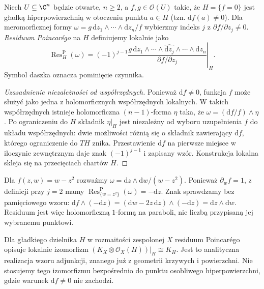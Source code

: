 \begin{definicja}
\label{def:ga4-poincare-res}
Niech $U\subseteq\C^n$ będzie otwarte, $n\ge2$, a
$f,g\in\mathcal O(U)$ takie, że $H=\{f=0\}$ jest
gładką hiperpowierzchnią w otoczeniu punktu $a\in H$
(tzn. $\mathrm df(a)\ne0$). Dla meromorficznej formy
$\omega=g\,\mathrm dz_1\wedge\cdots\wedge\mathrm dz_n/f$
wybierzmy indeks $j$ z $\partial f/\partial z_j\ne0$.
\emph{Residuum Poincarégo} na $H$ definiujemy lokalnie jako
\[
\operatorname{Res}_H^{\mathrm P}(\omega)
=\left.(-1)^{j-1}\frac{g\,\mathrm dz_1\wedge\cdots
\wedge\widehat{\mathrm dz_j}\wedge\cdots\wedge\mathrm dz_n}
{\partial f/\partial z_j}\right|_H.
\]
Symbol daszka oznacza pominięcie czynnika.
\end{definicja}
\begin{proof}[Uzasadnienie niezależności od współrzędnych]
Ponieważ $\mathrm df\ne0$, funkcja $f$ może służyć
jako jedna z holomorficznych współrzędnych lokalnych.
W takich współrzędnych istnieje holomorficzna $(n-1)$-forma
$\eta$ taka, że $\omega=(\mathrm df/f)\wedge\eta$.
Po ograniczeniu do $H$ składnik $\eta|_H$ jest
niezależny od wyboru uzupełnienia $f$ do układu
współrzędnych: dwie możliwości różnią się o składnik
zawierający $\mathrm df$, którego ograniczenie do $TH$
znika. Przestawienie $\mathrm df$ na pierwsze miejsce
w iloczynie zewnętrznym daje znak $(-1)^{j-1}$
i zapisany wzór. Konstrukcja lokalna skleja się na
przecięciach chartów $H$.
\end{proof}

\begin{przyklad}
Dla $f(z,w)=w-z^2$ rozważmy
$\omega=\mathrm dz\wedge\mathrm dw/(w-z^2)$.
Ponieważ $\partial_w f=1$, z definicji przy $j=2$ mamy
$\operatorname{Res}^{\mathrm P}_{\{w=z^2\}}(\omega)=-\mathrm dz$.
Znak sprawdzamy bez pamięciowego wzoru:
$\mathrm df\wedge(-\mathrm dz)
=(\mathrm dw-2z\,\mathrm dz)\wedge(-\mathrm dz)
=\mathrm dz\wedge\mathrm dw$.
Residuum jest więc holomorficzną $1$-formą na paraboli,
nie liczbą przypisaną jej wybranemu punktowi.
\end{przyklad}

\begin{uwaga}
Dla gładkiego dzielnika $H$ w rozmaitości zespolonej $X$
residuum Poincarégo opisuje lokalnie izomorfizm
$(K_X\otimes\mathcal O_X(H))|_H\cong K_H$.
Jest to analityczna realizacja wzoru adjunkcji,
znanego już z geometrii krzywych i powierzchni.
Nie stosujemy tego izomorfizmu bezpośrednio do punktu
osobliwego hiperpowierzchni, gdzie warunek $\mathrm df\ne0$
nie zachodzi.
\end{uwaga}

